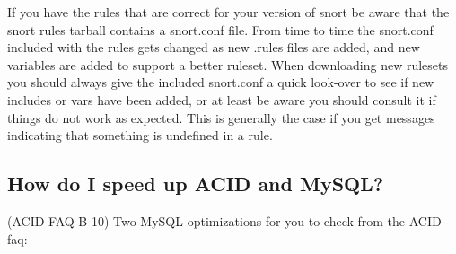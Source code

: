 \documentclass{article}
\begin{document}
If you have the rules that are correct for your version of snort be aware that
the snort rules tarball contains a snort.conf file. From time to time the
snort.conf included with the rules gets changed as new .rules files are added,
and new variables are added to support a better ruleset. When downloading new
rulesets you should always give the included snort.conf a quick look-over to
see if new includes or vars have been added, or at least be aware you should
consult it if things do not work as expected. This is generally the case if you
get messages indicating that something is undefined in a rule.

\subsection{How do I speed up ACID and MySQL?}

(ACID FAQ B-10)
Two MySQL optimizations for you to check from the ACID faq:
\end{document}
